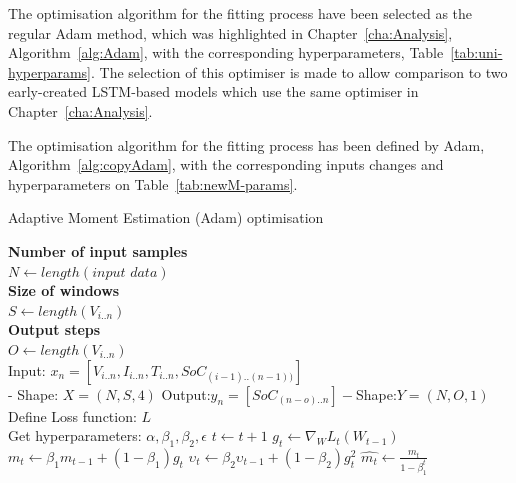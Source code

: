 %
%
{
The optimisation algorithm for the fitting process have been selected as the regular Adam method, which was highlighted in Chapter~\ref{cha:Analysis}, \mbox{Algorithm~\ref{alg:Adam}}, with the corresponding hyperparameters, \mbox{Table~\ref{tab:uni-hyperparams}}.
The selection of this optimiser is made to allow comparison to two early-created LSTM-based models which use the same optimiser in Chapter~\ref{cha:Analysis}.
}
{
The optimisation algorithm for the fitting process has been defined by Adam, \mbox{Algorithm~\ref{alg:copyAdam}}, with the corresponding inputs changes and hyperparameters on \mbox{Table~\ref{tab:newM-params}}. %
\begin{algorithm}
    \caption{Adaptive Moment Estimation (Adam) optimisation}
    \begin{algorithmic}[1]
        \STATE \textbf{Number of input samples} \\ $N\gets length(\textit{input data})$\\
        \STATE \textbf{Size of windows} \\ $S\gets length(V_{i..n})$\\
        \STATE \textbf{Output steps} \\ $O\gets length(V_{i..n})$\\
        \STATE Input: $x_n = [V_{i..n}, I_{i..n}, T_{i..n}, SoC_{(i-1)..(n-1))}]$ \\
        - Shape: $X = (N, S, 4)$
        \STATE Output:$y_n = [SoC_{(n-o)..n}] - $Shape:$Y = (N, O, 1)$
        \STATE Define Loss function: $L$ \\
                Get hyperparameters: $\alpha, \beta_1, \beta_2, \epsilon$
        \STATE $t \gets t+1$
        \STATE $g_t \gets \nabla_W L_t (W_{t-1})$ 
        \STATE $m_t \gets \beta_1 m_{t-1}+(1-\beta_1) g_t $ 
        \STATE $\upsilon_t \gets \beta_2 \upsilon_{t-1}+ \left(1-\beta_2 \right)g^2_t $ 
        \STATE $\hat{m_t} \gets \frac{m_t}{1-\beta^t_1}$ 

\end{algorithmic}
\end{algorithm}}
